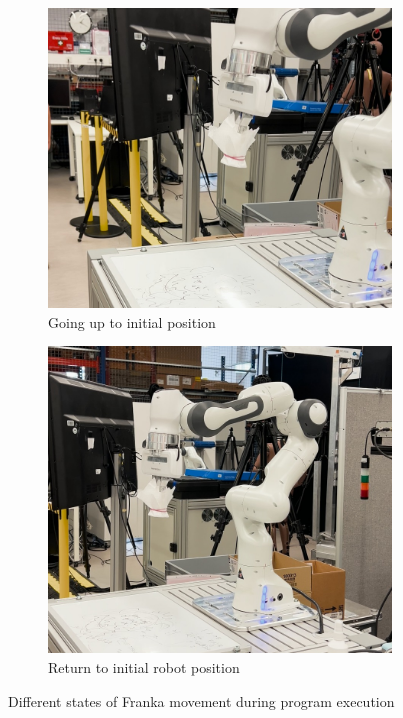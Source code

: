 \begin{figure}[htbp]
    \begin{subfigure}{0.45\textwidth}
        \centering
        \includegraphics[width=\textwidth]{figures/up-pos-robot.png}
        \caption{Going up to initial position}
        \label{fig:franka-up}
    \end{subfigure}
    \hfill
    \begin{subfigure}{0.45\textwidth}
        \centering
        \includegraphics[width=\textwidth]{figures/initial-pos-robot.png}
        \caption{Return to initial robot position}
        \label{fig:franka-init}
    \end{subfigure}

    \caption{Different states of Franka movement during program execution}
    \label{fig:franka-grid}
\end{figure}
